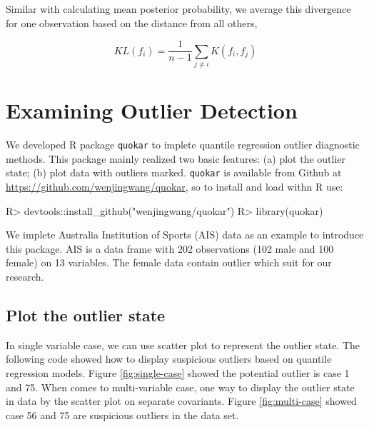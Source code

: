 \documentclass[article]{jss}
\theoremstyle{definition}
\theoremstyle{definition}
\theoremstyle{remark}
\begin{document}
Similar with calculating mean posterior probability, we average this
divergence for one observation based on the distance from all others,

\begin{equation}
KL(f_i)=\frac{1}{n-1}\sum_{j\neq i}K(f_i, f_j)
\label{eq:mean_posterior_kl}
\end{equation}

\section{Examining Outlier Detection}\label{examining-outlier-detection}

We developed R package \texttt{quokar} to implete quantile regression
outlier diagnostic methods. This package mainly realized two basic
features: (a) plot the outlier state; (b) plot data with outliers
marked. \texttt{quokar} is available from Github at
\url{https://github.com/wenjingwang/quokar}, so to install and load
withn R use:

\begin{CodeChunk}

\begin{CodeInput}
R> devtools::install_github("wenjingwang/quokar")
R> library(quokar)
\end{CodeInput}
\end{CodeChunk}

We implete Australia Institution of Sports (AIS) data as an example to
introduce this package. AIS is a data frame with 202 observations (102
male and 100 female) on 13 variables. The female data contain outlier
which suit for our research.

\subsection{Plot the outlier state}\label{plot-the-outlier-state}

In single variable case, we can use scatter plot to represent the
outlier state. The following code showed how to display suspicious
outliers based on quantile regression models. Figure
\ref{fig:single-case} showed the potential outlier is case 1 and 75.
When comes to multi-variable case, one way to display the outlier state
in data by the scatter plot on separate covariants. Figure
\ref{fig:multi-case} showed case 56 and 75 are suspicious outliers in
the data set.
\end{document}
